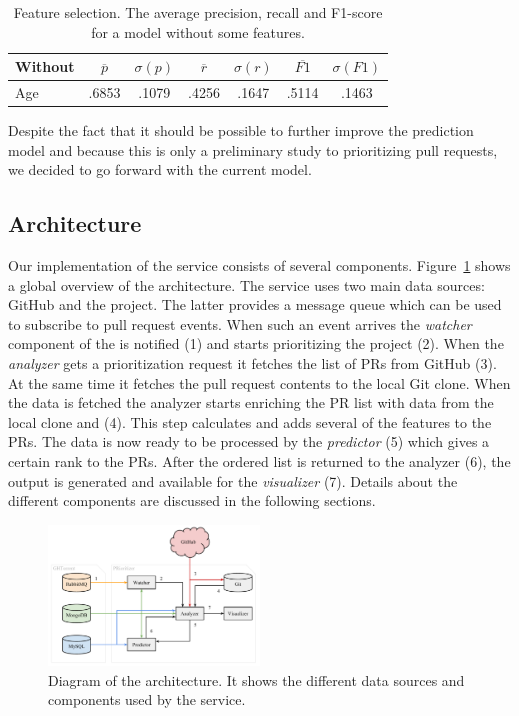 \begin{table}
  \begin{tabular}{ l | c | c | c | c | c | c }
    Without & $\overline{p}$ & $\sigma(p)$ & $\overline{r}$ & $\sigma(r)$ & $\overline{F1}$ & $\sigma(F1)$ \\ \hline
    \hline
    Age & .6853 & .1079 & .4256 & .1647 & .5114 & .1463 \\
  \end{tabular}
  \caption[Feature selection]{Feature selection. The average precision, recall and F1-score for a model without some features. }
  \label{tab:feature-selection}
\end{table}

Despite the fact that it should be possible to further improve the prediction model and because this is only a preliminary study to prioritizing pull requests, we decided to go forward with the current model.

\subsection{Architecture}
\label{sec:architecture}

Our implementation of the service consists of several components.
Figure~\ref{fig:architecture} shows a global overview of the architecture.
The \prioritizer service uses two main data sources: GitHub and the \ghtorrent project.
The latter provides a message queue which can be used to subscribe to pull request events.
When such an event arrives the \emph{watcher} component of the \prioritizer is notified (1) and starts prioritizing the project (2).
When the \emph{analyzer} gets a prioritization request it fetches the list of PRs from GitHub (3).
At the same time it fetches the pull request contents to the local Git clone.
When the data is fetched the analyzer starts enriching the PR list with data from the local clone and \ghtorrent (4).
This step calculates and adds several of the features to the PRs.
The data is now ready to be processed by the \emph{predictor} (5) which gives a certain rank to the PRs.
After the ordered list is returned to the analyzer (6), the output is generated and available for the \emph{visualizer} (7).
Details about the different components are discussed in the following sections.

\begin{figure}
  \centering
  \includegraphics[width=0.5\textwidth]{../figs/architecture.pdf}
  \caption[Diagram of the architecture]
   {Diagram of the architecture. It shows the different data sources and components used by the \prioritizer service.}
  \label{fig:architecture}
\end{figure}

